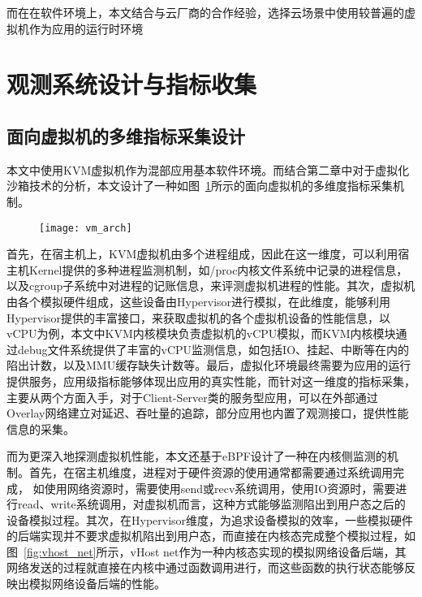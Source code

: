 而在在软件环境上，本文结合与云厂商的合作经验，选择云场景中使用较普遍的虚拟机作为应用的运行时环境

\section{观测系统设计与指标收集}

\subsection{面向虚拟机的多维指标采集设计}


本文中使用KVM虚拟机作为混部应用基本软件环境。而结合第二章中对于虚拟化沙箱技术的分析，本文设计了一种如图~\ref{fig:vm_arch}所示的面向虚拟机的多维度指标采集机制。

\begin{figure}[!htbp]
    \centering
    \texttt{[image: vm\_arch]}
    \label{fig:vm_arch}
\end{figure}

首先，在宿主机上，KVM虚拟机由多个进程组成，因此在这一维度，可以利用宿主机Kernel提供的多种进程监测机制，如/proc内核文件系统中记录的进程信息，以及cgroup子系统中对进程的记账信息，来评测虚拟机进程的性能。其次，虚拟机由各个模拟硬件组成，这些设备由Hypervisor进行模拟，在此维度，能够利用Hypervisor提供的丰富接口，来获取虚拟机的各个虚拟机设备的性能信息，以vCPU为例，本文中KVM内核模块负责虚拟机的vCPU模拟，而KVM内核模块通过debug文件系统提供了丰富的vCPU监测信息，如包括IO、挂起、中断等在内的陷出计数，以及MMU缓存缺失计数等。最后，虚拟化环境最终需要为应用的运行提供服务，应用级指标能够体现出应用的真实性能，而针对这一维度的指标采集，主要从两个方面入手，对于Client-Server类的服务型应用，可以在外部通过Overlay网络建立对延迟、吞吐量的追踪，部分应用也内置了观测接口，提供性能信息的采集。

而为更深入地探测虚拟机性能，本文还基于eBPF设计了一种在内核侧监测的机制。首先，在宿主机维度，进程对于硬件资源的使用通常都需要通过系统调用完成， 如使用网络资源时，需要使用send或recv系统调用，使用IO资源时，需要进行read、write系统调用，对虚拟机而言，这种方式能够监测陷出到用户态之后的设备模拟过程。其次，在Hypervisor维度，为追求设备模拟的效率，一些模拟硬件的后端实现并不要求虚拟机陷出到用户态，而直接在内核态完成整个模拟过程，如图~\ref{fig:vhost_net}所示，vHost net作为一种内核态实现的模拟网络设备后端，其网络发送的过程就直接在内核中通过函数调用进行，而这些函数的执行状态能够反映出模拟网络设备后端的性能。

